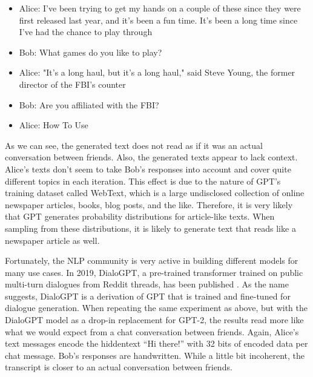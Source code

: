 \begin{example}
\leavevmode
\begin{itemize}
\item Alice: I've been trying to get my hands on a couple of these since they were first released last year, and it's been a fun time. It's been a long time since I've had the chance to play through
\item Bob: What games do you like to play?
\item Alice: "It's a long haul, but it's a long haul," said Steve Young, the former director of the FBI's counter
\item Bob: Are you affiliated with the FBI?
\item Alice: How To Use
\end{itemize}
\end{example}

As we can see, the generated text does not read as if it was an actual conversation between friends.
Also, the generated texts appear to lack context.
Alice's texts don't seem to take Bob's responses into account and cover quite different topics in each iteration.
This effect is due to the nature of GPT's training dataset called WebText, which is a large undisclosed collection of online newspaper articles, books, blog posts, and the like.
Therefore, it is very likely that GPT generates probability distributions for article-like texts.
When sampling from these distributions, it is likely to generate text that reads like a newspaper article as well.

Fortunately, the NLP community is very active in building different models for many use cases.
In 2019, DialoGPT, a pre-trained transformer trained on public multi-turn dialogues from Reddit threads, has been published \cite{Zhang2020}.
As the name suggests, DialoGPT is a derivation of GPT that is trained and fine-tuned for dialogue generation.
When repeating the same experiment as above, but with the DialoGPT model as a drop-in replacement for GPT-2, the results read more like what we would expect from a chat conversation between friends.
Again, Alice's text messages encode the hiddentext ``Hi there!'' with 32 bits of encoded data per chat message.
Bob's responses are handwritten.
While a little bit incoherent, the transcript is closer to an actual conversation between friends.

